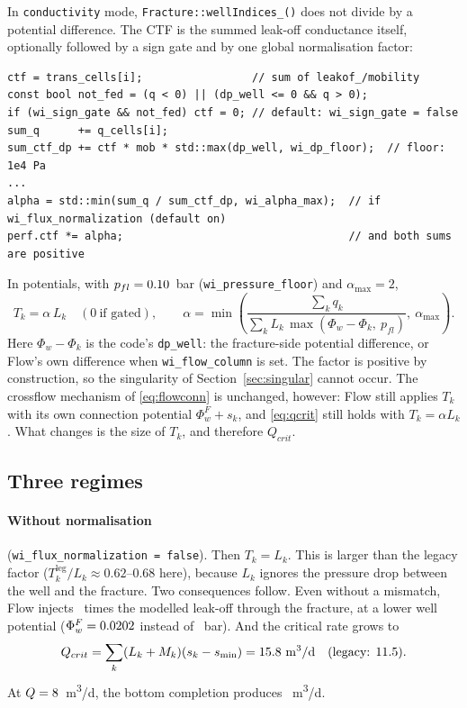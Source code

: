\documentclass[11pt,a4paper]{article}
\newcommand{\Phiw}{\Phi_w}
\newcommand{\rated}{\si{m^3/d}}
\begin{document}
In \texttt{conductivity} mode, \texttt{Fracture::wellIndices\_()} does not divide by a potential
difference.  The CTF is the summed leak-off conductance itself, optionally followed by a sign
gate and by one global normalisation factor:
\begin{lstlisting}
ctf = trans_cells[i];                 // sum of leakof_/mobility
const bool not_fed = (q < 0) || (dp_well <= 0 && q > 0);
if (wi_sign_gate && not_fed) ctf = 0; // default: wi_sign_gate = false
sum_q      += q_cells[i];
sum_ctf_dp += ctf * mob * std::max(dp_well, wi_dp_floor);  // floor: 1e4 Pa
...
alpha = std::min(sum_q / sum_ctf_dp, wi_alpha_max);  // if wi_flux_normalization (default on)
perf.ctf *= alpha;                                   // and both sums are positive
\end{lstlisting}
In potentials, with $p_{fl}=0.10$~bar (\texttt{wi\_pressure\_floor}) and $\alpha_{\max}=2$,
\begin{equation}
  T_k=\alpha\,L_k\quad(0\ \text{if gated}),\qquad
  \alpha=\min\!\left(\frac{\sum_k q_k}{\sum_k L_k\,\max(\Phiw-\Phi_k,\ p_{fl})},\ \alpha_{\max}\right).
  \label{eq:cond}
\end{equation}
Here $\Phiw-\Phi_k$ is the code's \texttt{dp\_well}: the fracture-side potential difference, or
Flow's own difference when \texttt{wi\_flow\_column} is set.  The factor is positive by
construction, so the singularity of Section~\ref{sec:singular} cannot occur.  The
crossflow mechanism of \eqref{eq:flowconn} is unchanged, however: Flow still applies $T_k$ with
its own connection potential $\Phiw^F+s_k$, and \eqref{eq:qcrit} still holds with $T_k=\alpha L_k$.
What changes is the size of $T_k$, and therefore $Q_{crit}$.

\subsection{Three regimes}

\paragraph{Without normalisation} (\texttt{wi\_flux\_normalization = false}).  Then $T_k=L_k$.
This is larger than the legacy factor ($T^{\text{leg}}_k/L_k\approx0.62$--$0.68$ here), because
$L_k$ ignores the pressure drop between the well and the fracture.  Two consequences follow.
Even without a mismatch, Flow injects \shareCN\ times the modelled leak-off through the
fracture, at a lower well potential ($\Phiw^F=\phiwCN$ instead of \phiwref~bar).  And the
critical rate grows to
\[
  Q_{crit}=\sum_k(L_k+M_k)(s_k-s_{\min})=\QcritNonormAn~\text{\rated}\quad(\text{legacy: }\Qcrit).
\]
At $Q=8$~\rated, the bottom completion produces \qCNbot~\rated.
\end{document}

